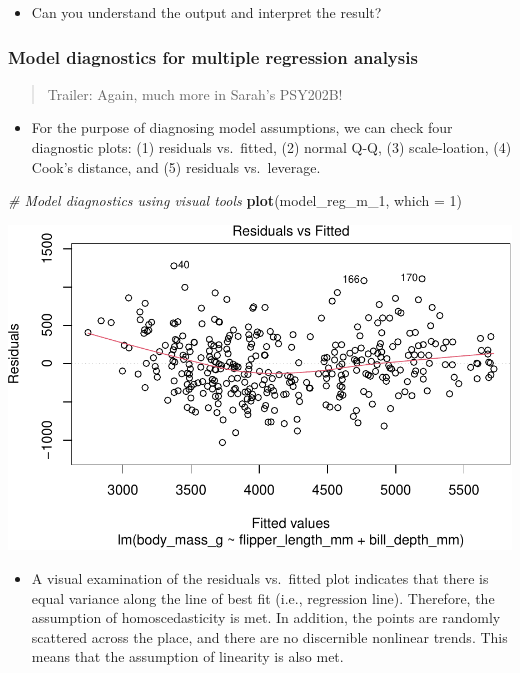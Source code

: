\documentclass[
]{book}
\newenvironment{Shaded}{\begin{snugshade}}{\end{snugshade}}
\newcommand{\AttributeTok}[1]{\textcolor[rgb]{0.13,0.29,0.53}{#1}}
\newcommand{\CommentTok}[1]{\textcolor[rgb]{0.56,0.35,0.01}{\textit{#1}}}
\newcommand{\DecValTok}[1]{\textcolor[rgb]{0.00,0.00,0.81}{#1}}
\newcommand{\FunctionTok}[1]{\textcolor[rgb]{0.13,0.29,0.53}{\textbf{#1}}}
\newcommand{\NormalTok}[1]{#1}
\providecommand{\tightlist}{%
  \setlength{\itemsep}{0pt}\setlength{\parskip}{0pt}}
\begin{document}
\begin{itemize}
\tightlist
\item
  Can you understand the output and interpret the result?
\end{itemize}

\subsubsection{Model diagnostics for multiple regression analysis}\label{model-diagnostics-for-multiple-regression-analysis}

\begin{quote}
Trailer: Again, much more in Sarah's PSY202B!
\end{quote}

\begin{itemize}
\tightlist
\item
  For the purpose of diagnosing model assumptions, we can check four diagnostic plots: (1) residuals vs.~fitted, (2) normal Q-Q, (3) scale-loation, (4) Cook's distance, and (5) residuals vs.~leverage.
\end{itemize}

\begin{Shaded}
\begin{Highlighting}[]
\CommentTok{\# Model diagnostics using visual tools}
\FunctionTok{plot}\NormalTok{(model\_reg\_m\_1, }\AttributeTok{which =} \DecValTok{1}\NormalTok{)}
\end{Highlighting}
\end{Shaded}

\includegraphics{PSY202A-Modeling-I.Heo_files/figure-latex/unnamed-chunk-118-1.pdf}

\begin{itemize}
\tightlist
\item
  A visual examination of the residuals vs.~fitted plot indicates that there is equal variance along the line of best fit (i.e., regression line). Therefore, the assumption of homoscedasticity is met. In addition, the points are randomly scattered across the place, and there are no discernible nonlinear trends. This means that the assumption of linearity is also met.
\end{itemize}
\end{document}
